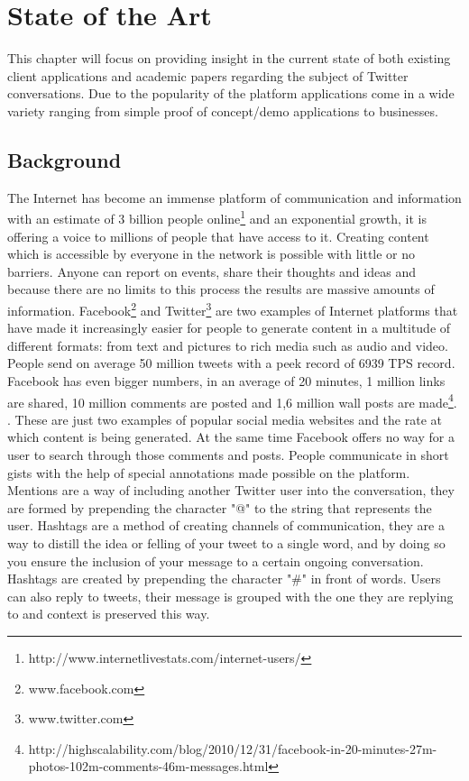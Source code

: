 \chapter{State of the Art}
\label{chapter:stateoftheart}

This chapter will focus on providing insight in the current state of both existing client applications and academic papers regarding the subject of Twitter conversations. Due to the popularity of the platform applications come in a wide variety ranging from simple proof of concept/demo applications to businesses.

\section{Background}
\label{sec:background}

The Internet has become an immense platform of communication and information with an estimate of 3 billion people online\footnote{http://www.internetlivestats.com/internet-users/} and an exponential growth, it is offering a voice to millions of people that have access to it.
Creating content which is accessible by everyone in the network is possible with little or no barriers. Anyone can report on events, share their thoughts and ideas and because there are no limits to this process the results are massive amounts of information.
\newline
Facebook\footnote{www.facebook.com} and Twitter\footnote{www.twitter.com} are two examples of Internet platforms that have made it increasingly easier for people to generate content in a multitude of different formats: from text and pictures to rich media such as audio and video.
\newline
People send on average 50 million tweets with a peek record of 6939 TPS record. Facebook has even bigger numbers, in an average of 20 minutes, 1 million links are shared, 10 million comments are posted and 1,6 million wall posts are made\footnote{http://highscalability.com/blog/2010/12/31/facebook-in-20-minutes-27m-photos-102m-comments-46m-messages.html}. . These are just two examples of popular social media websites and the rate at which content is being generated.
\newline
At the same time Facebook offers no way for a user to search through those comments and posts. 
\newline
People communicate in short gists with the help of special annotations made possible on the platform. Mentions are a way of including another Twitter user into the conversation, they are formed by prepending the character "@" to the string that represents the user. Hashtags are a method of creating channels of communication, they are a way to distill the idea or felling of your tweet to a single word, and by doing so you ensure the inclusion of your message to a certain ongoing conversation. Hashtags are created by prepending the character "\#" in front of words. Users can also reply to tweets, their message is grouped with the one they are replying to and context is preserved this way.
